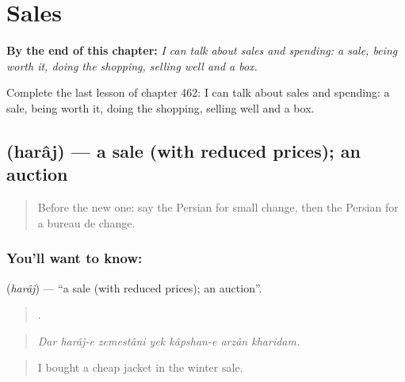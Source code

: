 
\chapter{Sales}
\label{ch:fa-sales}

\begin{chapteropening}
\textbf{By the end of this chapter:} \emph{I can talk about sales and spending: a sale, being worth it, doing the shopping, selling well and a box.}

Complete the last lesson of chapter 462: I can talk about sales and spending: a sale, being worth it, doing the shopping, selling well and a box.
\end{chapteropening}

\section[\texorpdfstring{\fa{حراج} (harâj)}{حراج (harâj)}]{ (harâj) — a sale (with reduced prices); an auction}

\label{lesson:FA-C462-haraj}



\begin{quote}
Before the new one: say the Persian for small change, then the Persian for a bureau de change.
\end{quote}

\subsection*{You'll want to know: }
\textbf{} (\emph{harâj}) — \textquotedblleft{}a sale (with reduced prices); an auction\textquotedblright{}.

\begin{quote}
      .
\end{quote}

\begin{quote}
\emph{Dar harâj-e zemestâni yek kâpshan-e arzân kharidam.}
\end{quote}

\begin{quote}
I bought a cheap jacket in the winter sale.
\end{quote}

